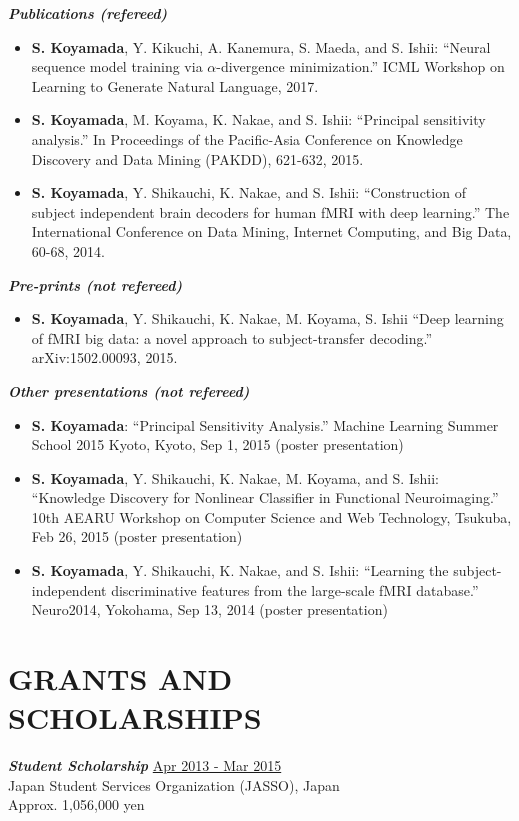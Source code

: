 \documentclass[margin, 10pt]{res} %
\begin{document}
\begin{resume}
{\sl {\bf Publications (refereed)}} \vspace{0.5em}
\begin{itemize}
\item {\bf S. Koyamada}, Y. Kikuchi, A. Kanemura, S. Maeda, and S. Ishii: ``Neural sequence model training via $\alpha$-divergence minimization.'' ICML Workshop on Learning to Generate Natural Language, 2017.
\item {\bf S. Koyamada}, M. Koyama, K. Nakae, and S. Ishii: ``Principal sensitivity analysis.'' In Proceedings of the Pacific-Asia Conference on Knowledge Discovery and Data Mining (PAKDD), 621-632, 2015.
\item {\bf S. Koyamada}, Y. Shikauchi, K. Nakae, and S. Ishii: ``Construction of subject independent brain decoders for human fMRI with deep learning.'' The International Conference on Data Mining, Internet Computing, and Big Data, 60-68, 2014.
\end{itemize}

{\sl {\bf Pre-prints (not refereed)}} \vspace{0.5em}
\begin{itemize}
\item {\bf S. Koyamada}, Y. Shikauchi, K. Nakae, M. Koyama, S. Ishii ``Deep learning of fMRI big data: a novel approach to subject-transfer decoding.'' arXiv:1502.00093, 2015.
\end{itemize}

{\sl {\bf Other presentations (not refereed)}} \vspace{0.5em}
\begin{itemize}
\item {\bf S. Koyamada}: ``Principal Sensitivity Analysis.'' Machine Learning Summer School 2015 Kyoto, Kyoto, Sep 1, 2015 (poster presentation)
\item {\bf S. Koyamada}, Y. Shikauchi, K. Nakae, M. Koyama, and S. Ishii: ``Knowledge Discovery for Nonlinear Classifier in Functional Neuroimaging.'' 10th AEARU Workshop on Computer Science and Web Technology, Tsukuba, Feb 26, 2015 (poster presentation)
\item {\bf S. Koyamada}, Y. Shikauchi, K. Nakae, and S. Ishii: ``Learning the subject-independent discriminative features from the large-scale fMRI database.'' Neuro2014, Yokohama, Sep 13, 2014 (poster presentation)
\end{itemize}

\section{{\small GRANTS AND\\SCHOLARSHIPS}}
{\sl {\bf Student Scholarship}} \hfill {\small \underline{Apr 2013 - Mar 2015}} \\
Japan Student Services Organization (JASSO), Japan \\
Approx. 1,056,000 yen


\end{resume}
\end{document}
